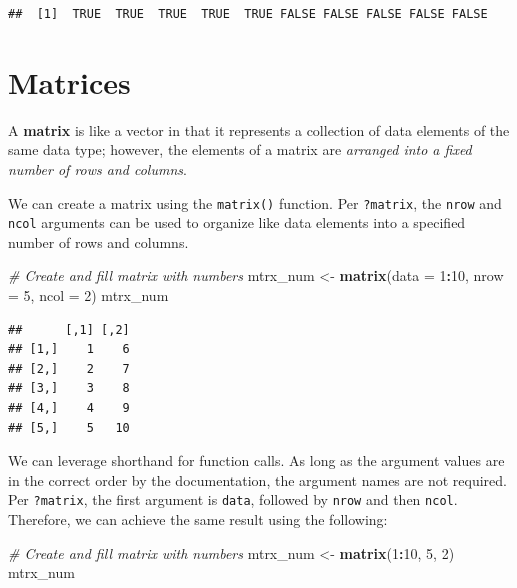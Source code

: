 \documentclass[]{book}
\newenvironment{Shaded}{\begin{snugshade}}{\end{snugshade}}
\newcommand{\CommentTok}[1]{\textcolor[rgb]{0.56,0.35,0.01}{\textit{#1}}}
\newcommand{\DataTypeTok}[1]{\textcolor[rgb]{0.13,0.29,0.53}{#1}}
\newcommand{\DecValTok}[1]{\textcolor[rgb]{0.00,0.00,0.81}{#1}}
\newcommand{\KeywordTok}[1]{\textcolor[rgb]{0.13,0.29,0.53}{\textbf{#1}}}
\newcommand{\NormalTok}[1]{#1}
\newcommand{\OperatorTok}[1]{\textcolor[rgb]{0.81,0.36,0.00}{\textbf{#1}}}
\newcommand{\StringTok}[1]{\textcolor[rgb]{0.31,0.60,0.02}{#1}}
\begin{document}
\begin{verbatim}
##  [1]  TRUE  TRUE  TRUE  TRUE  TRUE FALSE FALSE FALSE FALSE FALSE
\end{verbatim}

\hypertarget{matrices}{%
\section{Matrices}\label{matrices}}

A \textbf{matrix} is like a vector in that it represents a collection of data elements of the same data type; however, the elements of a matrix are \emph{arranged into a fixed number of rows and columns}.

We can create a matrix using the \texttt{matrix()} function. Per \texttt{?matrix}, the \texttt{nrow} and \texttt{ncol} arguments can be used to organize like data elements into a specified number of rows and columns.

\begin{Shaded}
\begin{Highlighting}[]
\CommentTok{# Create and fill matrix with numbers}
\NormalTok{mtrx_num <-}\StringTok{ }\KeywordTok{matrix}\NormalTok{(}\DataTypeTok{data =} \DecValTok{1}\OperatorTok{:}\DecValTok{10}\NormalTok{, }\DataTypeTok{nrow =} \DecValTok{5}\NormalTok{, }\DataTypeTok{ncol =} \DecValTok{2}\NormalTok{)}
\NormalTok{mtrx_num}
\end{Highlighting}
\end{Shaded}

\begin{verbatim}
##      [,1] [,2]
## [1,]    1    6
## [2,]    2    7
## [3,]    3    8
## [4,]    4    9
## [5,]    5   10
\end{verbatim}

We can leverage shorthand for function calls. As long as the argument values are in the correct order by the documentation, the argument names are not required. Per \texttt{?matrix}, the first argument is \texttt{data}, followed by \texttt{nrow} and then \texttt{ncol}. Therefore, we can achieve the same result using the following:

\begin{Shaded}
\begin{Highlighting}[]
\CommentTok{# Create and fill matrix with numbers}
\NormalTok{mtrx_num <-}\StringTok{ }\KeywordTok{matrix}\NormalTok{(}\DecValTok{1}\OperatorTok{:}\DecValTok{10}\NormalTok{, }\DecValTok{5}\NormalTok{, }\DecValTok{2}\NormalTok{)}
\NormalTok{mtrx_num}
\end{Highlighting}
\end{Shaded}
\end{document}
